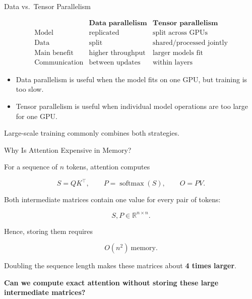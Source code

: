 \documentclass[11pt,compress,t,notes=noshow, xcolor=table]{beamer}
\begin{document}
\begin{vbframe}{Data vs.\ Tensor Parallelism}

\[
\begin{array}{l|cc}
 & \textbf{Data parallelism} & \textbf{Tensor parallelism} \\
\hline
\text{Model} & \text{replicated} & \text{split across GPUs} \\
\text{Data} & \text{split} & \text{shared/processed jointly} \\
\text{Main benefit} & \text{higher throughput} & \text{larger models fit} \\
\text{Communication} & \text{between updates} & \text{within layers}
\end{array}
\]

\begin{itemize}
    \item Data parallelism is useful when the model fits on one GPU,
          but training is too slow.
    \item Tensor parallelism is useful when individual model operations
          are too large for one GPU.
\end{itemize}

Large-scale training commonly combines both strategies.

\end{vbframe}



\begin{vbframe}{Why Is Attention Expensive in Memory?}

For a sequence of $n$ tokens, attention computes

\[
S = QK^\top,
\qquad
P = \operatorname{softmax}(S),
\qquad
O = PV.
\]

Both intermediate matrices contain one value for every pair of tokens:

\[
S,P \in \mathbb{R}^{n\times n}.
\]

Hence, storing them requires

\[
\boxed{O(n^2)\ \text{memory}.}
\]

Doubling the sequence length makes these matrices
about \textbf{4 times larger}.

\begin{center}
\textbf{Can we compute exact attention without storing
these large intermediate matrices?}
\end{center}

\end{vbframe}
\end{document}
